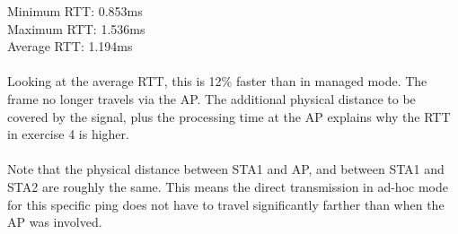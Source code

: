 Minimum RTT: 0.853ms\\
Maximum RTT: 1.536ms\\
Average RTT: 1.194ms\\\\

Looking at the average RTT, this is 12\% faster than in managed mode. The frame no longer travels via the AP. The additional physical distance to be covered by the signal, plus the processing time at the AP explains why the RTT in exercise 4 is higher. \\ \\
Note that the physical distance between STA1 and AP, and between STA1 and STA2 are roughly the same. This means the direct transmission in ad-hoc mode for this specific ping does not have to travel significantly farther than when the AP was involved.
